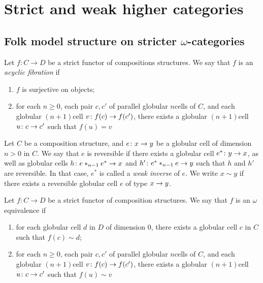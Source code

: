 \section{Strict and weak higher categories}

\subsection{Folk model structure on stricter \texorpdfstring{$\omega$}{ω}-categories}

\begin{dfn}  \label{dfn:acyclic_fibration}
    Let \( f \colon C \to D \) be a strict functor of compositions structures.
    We say that \( f \) is an \emph{acyclic fibration} if
    \begin{enumerate}
        \item \( f \) is surjective on objects;
        \item for each \( n \geq 0 \), each pair \( c, c' \) of parallel globular \( n \)\nbd cells of \( C \), and each globular \( (n + 1) \)\nbd cell \( v \colon f(c) \to f(c') \), there exists a globular \( (n + 1) \)\nbd cell \( u \colon c \to c' \) such that \( f(u) = v \)
    \end{enumerate}
\end{dfn}

\begin{dfn}  
    Let \( C \) be a composition structure, and \( e \colon x \to y \) be a globular cell of dimension \( n > 0 \) in \( C \).
    We say that \( e \) is reversible if there exists a globular cell \( e^* \colon y \to x \), as well as globular cells \( h \colon e *_{n - 1} e^* \to x \) and \( h' \colon e^* *_{n - 1} e \to y \) such that \( h \) and \( h' \) are reversible.
    In that case, \( e^* \) is called a \emph{weak inverse} of \( e \).
    We write \( x \sim y \) if there exists a reversible globular cell \( e \) of type \( x \to y \).
\end{dfn}

\begin{dfn} 
    Let \( f \colon C \to D \) be a strict functor of composition structures.
    We say that \( f \) is an \( \omega \)\nbd equivalence if
    \begin{enumerate}
        \item for each globular cell \( d \) in \( D \) of dimension \( 0 \), there exists a globular cell \( c \) in \( C \) such that \( f(c) \sim d \);
        \item for each \( n \geq 0 \), each pair \( c, c' \) of parallel globular \( n \)\nbd cells of \( C \), and each globular \( (n + 1) \)\nbd cell \( v \colon f(c) \to f(c') \), there exists a globular \( (n + 1) \)\nbd cell \( u \colon c \to c' \) such that \( f(u) \sim v \)
    \end{enumerate}
\end{dfn}

